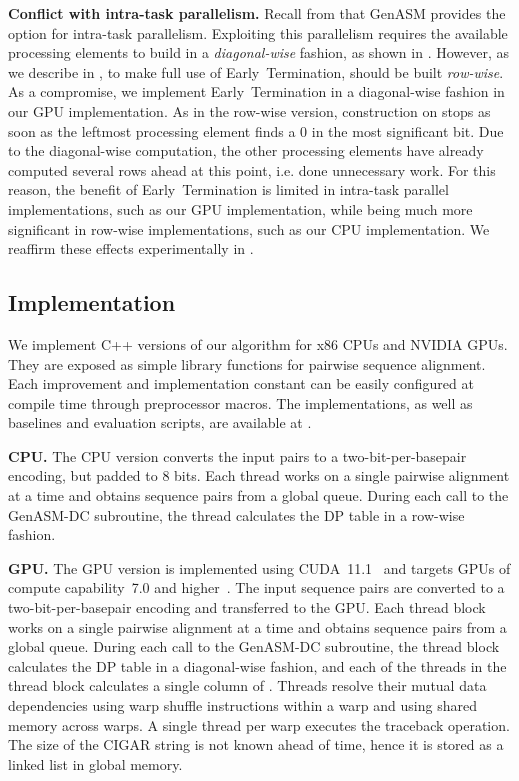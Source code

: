 \textbf{Conflict with intra-task parallelism.}
Recall from  that GenASM provides the option for intra-task parallelism.
Exploiting this parallelism requires the available processing elements to build  in a \emph{diagonal-wise} fashion, as shown in . However, as we describe in , to make full use of Early~Termination,  should be built \emph{row-wise}. As a compromise, we implement Early~Termination in a diagonal-wise fashion in our GPU implementation. As in the row-wise version, construction on  stops as soon as the leftmost processing element finds a 0 in the most significant bit. Due to the diagonal-wise computation, the other processing elements have already computed several rows ahead at this point, i.e. done unnecessary work. For this reason, the benefit of Early~Termination is limited in intra-task parallel implementations, such as our GPU implementation, while being much more significant in row-wise implementations, such as our CPU implementation. We reaffirm these effects experimentally in .

\subsection{Implementation} \label{sec:implementation}
We implement C++ versions of our algorithm for x86 CPUs and NVIDIA GPUs. They are exposed as simple library functions for pairwise sequence alignment. Each improvement and implementation constant can be easily configured at compile time through preprocessor macros. The implementations, as well as baselines and evaluation scripts, are available at \gitrepo.

\textbf{CPU.}
The CPU version converts the input pairs to a two-bit-per-basepair encoding, but padded to 8 bits. Each thread works on a single pairwise alignment at a time and obtains sequence pairs from a global queue. During each call to the GenASM-DC subroutine, the thread calculates the DP table  in a row-wise fashion.

\textbf{GPU.}
The GPU version is implemented using CUDA~11.1~\citep{cuda_guide} and targets GPUs of compute capability~7.0 and higher~\citep{cuda_gpus}. The input sequence pairs are converted to a two-bit-per-basepair encoding and transferred to the GPU. Each thread block works on a single pairwise alignment at a time and obtains sequence pairs from a global queue. During each call to the GenASM-DC subroutine, the thread block calculates the DP table  in a diagonal-wise fashion, and each of the  threads in the thread block calculates a single column of . Threads resolve their mutual data dependencies using warp shuffle instructions within a warp and using shared memory across warps. A single thread per warp executes the traceback operation. The size of the CIGAR string is not known ahead of time, hence it is stored as a linked list in global memory.


